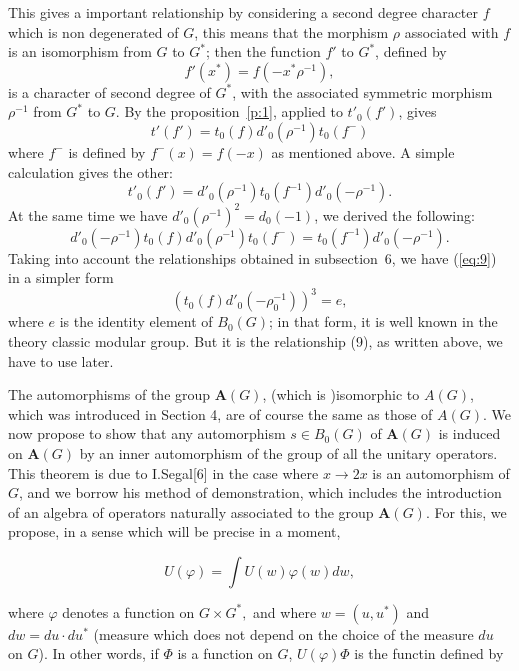 \documentclass[12pt]{amsart}
\newcounter{ssection}
\renewcommand{\subsection}{
  \addtocounter{ssection}{1}{\bf  \arabic{ssection}.\  }}
\begin{document}
 	
This gives a important relationship by considering a second degree character $f$
which is non degenerated of $G$, 	
this means that the morphism $\rho$ associated with $f$ is an isomorphism
from $G$ to $G^*$; then the function $f'$ to $G^*$, defined by 
\[
f'(x^*) = f(-x^*\rho^{-1}),
\]
is a character of second degree of $G^*$, with the associated symmetric 
morphism $\rho^{-1}$ from $G^*$ to $G$. 
By the proposition~\ref{p:1}, applied to $t'_0(f')$, gives
\[
t'(f')=t_0(f)d'_0(\rho^{-1})t_0(f^-)
\]
where $f^-$ is defined by $f^-(x)=f(-x)$ 	
as mentioned above.
A simple calculation gives the other:
\[
t'_0(f') = d'_0(\rho^{-1})t_0(f^{-1})d'_0(-\rho^{-1}).
\]
At the same time we have $d'_0(\rho^{-1})^2=d_0(-1)$, we derived the following:
\begin{equation}\label{eq:9}
d'_0(-\rho^{-1})t_0(f)d'_0(\rho^{-1})t_0(f^-)= t_0(f^{-1})d'_0(-\rho^{-1}).
\end{equation}
Taking into account the relationships obtained in subsection~6, 
we have (\ref{eq:9}) in a simpler form
\[
(t_0(f)d'_0(-\rho_0^{-1}))^3=e,
\] 
where $e$ is the identity element of $B_0(G)$; in that form, 
it is well known in the theory classic modular group.
But it is the relationship (9), as written above, we have to use later.

\subsection{}

The automorphisms of the group $\mathbf{A}(G)$, (which is )isomorphic
to $A(G)$, which was introduced in Section 4, are of course the same
as those of $A(G)$. We now propose to show that any automorphism
$s\in B_{0}(G)$ of $\mathbf{A}(G)$ is induced on $\mathbf{A}(G)$
by an inner automorphism of the group of all the unitary operators.
This theorem is due to I.Segal{[}6{]} in the case where $x\rightarrow2x$
is an automorphism of $G$, and we borrow his method of demonstration,
which includes the introduction of an algebra of operators naturally
associated to the group $\mathbf{A}(G)$. For this, we propose, in
a sense which will be precise in a moment,

\[
U(\varphi)=\int U(w)\varphi(w)dw,\]


where $\varphi$ denotes a function on $G\times G^{*},$ and where
$w=(u,u^{*})$ and $dw=du\cdot du^{*}$ (measure which does not depend
on the choice of the measure $du$ on $G$). In other words, if $\Phi$
is a function on $G$, $U(\varphi)\Phi$ is the functin defined by
\end{document}
